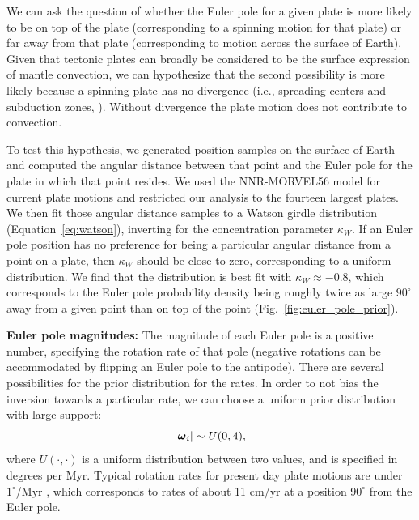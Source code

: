 \documentclass[11pt,letterpaper]{article}
\newcommand{\mitbf}[1]{\hbox{\mathversion{bold}$#1$}}
\begin{document}
We can ask the question of whether the Euler pole for a given plate is more likely to be on top of the plate (corresponding to a spinning motion for that plate) or far away from that plate (corresponding to motion across the surface of Earth). Given that tectonic plates can broadly be considered to be the surface expression of mantle convection, we can hypothesize that the second possibility is more likely because a spinning plate has no divergence (i.e., spreading centers and subduction zones, \citep{Forte1987a, Gable1991a}).  Without divergence the plate motion does not contribute to convection.

To test this hypothesis, we generated position samples on the surface of Earth and computed the angular distance between that point and the Euler pole for the plate in which that point resides. We used the NNR-MORVEL56 model for current plate motions \cite{Argus2011a} and restricted our analysis to the fourteen largest plates. We then fit those angular distance samples to a Watson girdle distribution (Equation~\eqref{eq:watson}),  inverting for the concentration parameter $\kappa_W$. If an Euler pole position has no preference for being a particular angular distance from a point on a plate, then $\kappa_W$ should be close to zero, corresponding to a uniform distribution. We find that the distribution is best fit with $\kappa_W \approx -0.8$, which corresponds to the Euler pole probability density being roughly twice as large $90^\circ$ away from a given point than on top of the point (Fig.~\ref{fig:euler_pole_prior}).

\textbf{Euler pole magnitudes:} 
The magnitude of each Euler pole is a positive number, specifying the rotation rate of that pole (negative rotations can be accommodated by flipping an Euler pole to the antipode). There are several possibilities for the prior distribution for the rates. In order to not bias the inversion towards a particular rate, we can choose a uniform prior distribution with large support:
\begin{equation}
\vert \mitbf{\omega}_i \vert \sim U(0, 4),
\end{equation}
where $U(\cdot, \cdot)$ is a uniform distribution between two values, and is specified  in degrees per Myr. Typical rotation rates for present day plate motions are under $1^\circ$/Myr \citep{Argus2011a}, which corresponds to rates of about 11 cm/yr at a position $90^\circ$ from the Euler pole.
\end{document}
